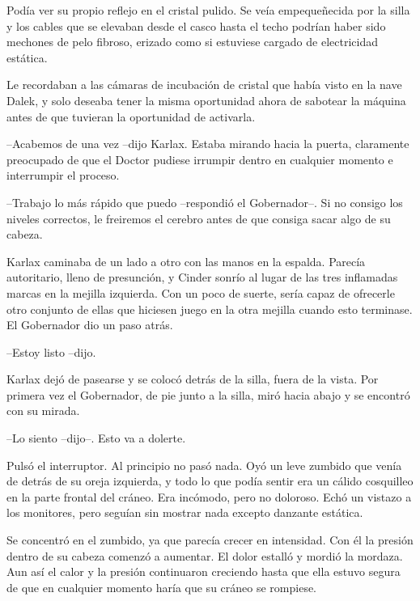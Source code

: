 Podía ver su propio reflejo en el cristal pulido. Se veía empequeñecida por la silla y los cables que se elevaban desde el casco hasta el techo podrían haber sido mechones de pelo fibroso, erizado como si estuviese cargado de electricidad estática. 

Le recordaban a las cámaras de incubación de cristal que había visto en la nave Dalek, y solo deseaba tener la misma oportunidad ahora de sabotear la máquina antes de que tuvieran la oportunidad de activarla. 



--Acabemos de una vez --dijo Karlax. Estaba mirando hacia la puerta, claramente preocupado de que el Doctor pudiese irrumpir dentro en cualquier momento e interrumpir el proceso. 



--Trabajo lo más rápido que puedo --respondió el Gobernador--. Si no consigo los niveles correctos, le freiremos el cerebro antes de que consiga sacar algo de su cabeza. 



Karlax caminaba de un lado a otro con las manos en la espalda. Parecía autoritario, lleno de presunción, y Cinder sonrío al lugar de las tres inflamadas marcas en la mejilla izquierda. Con un poco de suerte, sería capaz de ofrecerle otro conjunto de ellas que hiciesen juego en la otra mejilla cuando esto terminase. El Gobernador dio un paso atrás. 



--Estoy listo --dijo. 



Karlax dejó de pasearse y se colocó detrás de la silla, fuera de la vista. Por primera vez el Gobernador, de pie junto a la silla, miró hacia abajo y se encontró con su mirada. 



--Lo siento --dijo--. Esto va a dolerte. 



Pulsó el interruptor. Al principio no pasó nada. Oyó un leve zumbido que venía de detrás de su oreja izquierda, y todo lo que podía sentir era un cálido cosquilleo en la parte frontal del cráneo. Era incómodo, pero no doloroso. Echó un vistazo a los monitores, pero seguían sin mostrar nada excepto danzante estática.

Se concentró en el zumbido, ya que parecía crecer en intensidad. Con él la presión dentro de su cabeza comenzó a aumentar. El dolor estalló y mordió la mordaza. Aun así el calor y la presión continuaron creciendo hasta que ella estuvo segura de que en cualquier momento haría que su cráneo se rompiese. 

